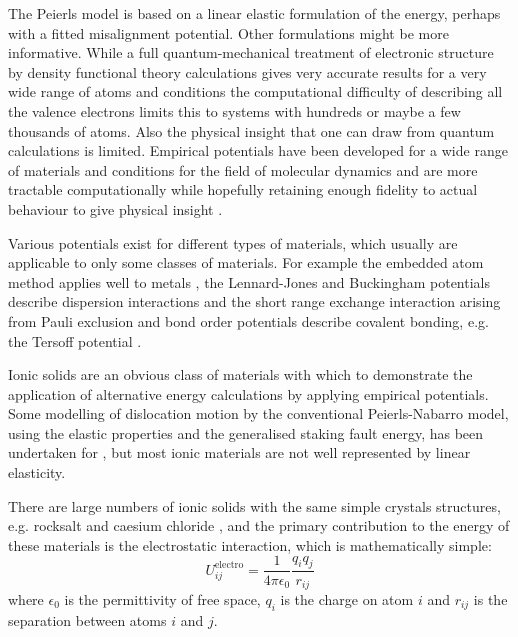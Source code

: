 


The Peierls model is based on a linear elastic formulation of the energy, perhaps with a fitted misalignment potential. Other formulations might be more informative. While a full quantum-mechanical treatment of electronic structure by density functional theory calculations gives very accurate results for a very wide range of atoms and conditions the computational difficulty of describing all the valence electrons limits this to systems with hundreds or maybe a few thousands of atoms. Also the physical insight that one can draw from quantum calculations is limited. Empirical potentials have been developed for a wide range of materials and conditions for the field of molecular dynamics and are more tractable computationally while hopefully retaining enough fidelity to actual behaviour to give physical insight \cite{martinez2013}.

Various potentials exist for different types of materials, which usually are applicable to only some classes of materials. For example the embedded atom method applies well to metals \cite{Daw1984}, the Lennard-Jones and Buckingham potentials describe dispersion interactions and the short range exchange interaction arising from Pauli exclusion \cite{Jones1924,Buckingham1938} and bond order potentials describe covalent bonding, e.g. the Tersoff potential \cite{Tersoff1988}. 


Ionic solids are an obvious class of materials with which to demonstrate the application of alternative energy calculations by applying empirical potentials. Some modelling of dislocation motion by the conventional Peierls-Nabarro model, using the elastic properties and the generalised staking fault energy, has been undertaken for  \cite{Miranda2005}, but most ionic materials are not well represented by linear elasticity. 

There are large numbers of ionic solids with the same simple crystals structures, e.g. rocksalt and caesium chloride \cite{Kelly2012app7}, and the primary contribution to the energy of these materials is the electrostatic interaction, which is mathematically simple:
\begin{equation}
U^{\text{electro}}_{ij} = \frac{1}{4\pi\epsilon_0} \frac{q_i q_j}{r_{ij}}
\end{equation}
where $\epsilon_0$ is the permittivity of free space, $q_i$ is the charge on atom $i$ and $r_{ij}$ is the separation between atoms $i$ and $j$.


